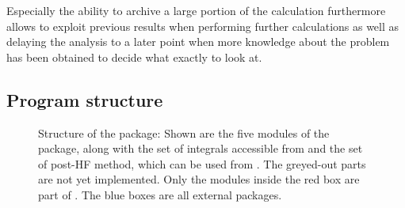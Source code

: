 Especially the ability to archive a large portion of the calculation
furthermore allows to exploit previous results when performing
further calculations as well as delaying the analysis
to a later point when \eg more knowledge about the
problem has been obtained to decide what exactly to look at.
%
%



\subsection{Program structure}
\label{sec:program-structure}


\begin{figure}
	\caption{Structure of the \molsturm package: Shown are the five modules of the package,
	along with the set of integrals accessible from \gint and the set of post-HF method,
	which can be used from \molsturm. The greyed-out parts are not yet implemented.
	Only the modules inside the red box are part of \molsturm. The blue boxes are all external packages.}
	\label{fig:structure}
\end{figure}

%
% 
%




